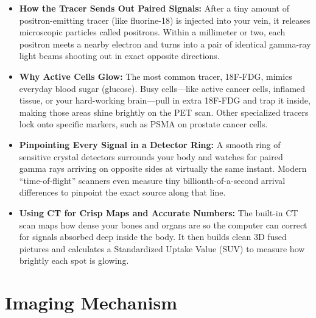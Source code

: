 \begin{itemize}
    \item \textbf{How the Tracer Sends Out Paired Signals:} After a tiny amount of positron-emitting tracer (like fluorine-18) is injected into your vein, it releases microscopic particles called positrons. Within a millimeter or two, each positron meets a nearby electron and turns into a pair of identical gamma-ray light beams shooting out in exact opposite directions.
    \item \textbf{Why Active Cells Glow:} The most common tracer, 18F-FDG, mimics everyday blood sugar (glucose). Busy cells---like active cancer cells, inflamed tissue, or your hard-working brain---pull in extra 18F-FDG and trap it inside, making those areas shine brightly on the PET scan. Other specialized tracers lock onto specific markers, such as PSMA on prostate cancer cells.
    \item \textbf{Pinpointing Every Signal in a Detector Ring:} A smooth ring of sensitive crystal detectors surrounds your body and watches for paired gamma rays arriving on opposite sides at virtually the same instant. Modern ``time-of-flight'' scanners even measure tiny billionth-of-a-second arrival differences to pinpoint the exact source along that line.
    \item \textbf{Using CT for Crisp Maps and Accurate Numbers:} The built-in CT scan maps how dense your bones and organs are so the computer can correct for signals absorbed deep inside the body. It then builds clean 3D fused pictures and calculates a Standardized Uptake Value (SUV) to measure how brightly each spot is glowing.
\end{itemize}

\section{Imaging Mechanism}

